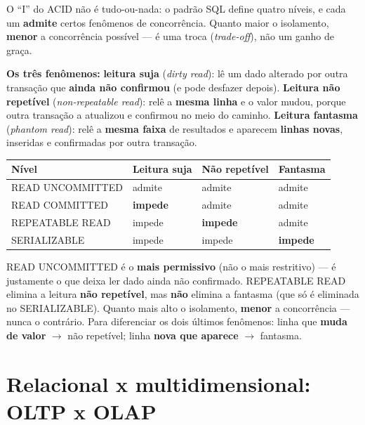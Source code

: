 \begin{conceito}
O “I” do ACID não é tudo-ou-nada: o padrão SQL define quatro níveis, e
cada um \textbf{admite} certos fenômenos de concorrência. Quanto maior o
isolamento, \textbf{menor} a concorrência possível --- é uma troca
(\textit{trade-off}), não um ganho de graça.

\textbf{Os três fenômenos:} \textbf{leitura suja} (\textit{dirty read}):
lê um dado alterado por outra transação que \textbf{ainda não confirmou}
(e pode desfazer depois). \textbf{Leitura não repetível}
(\textit{non-repeatable read}): relê a \textbf{mesma linha} e o valor
mudou, porque outra transação a atualizou e confirmou no meio do caminho.
\textbf{Leitura fantasma} (\textit{phantom read}): relê a \textbf{mesma
faixa} de resultados e aparecem \textbf{linhas novas}, inseridas e
confirmadas por outra transação.

\begin{center}
\begin{tabular}{@{}p{3.6cm}p{2.6cm}p{2.6cm}p{2.6cm}@{}}
\toprule
\textbf{Nível} & \textbf{Leitura suja} & \textbf{Não repetível} &
\textbf{Fantasma} \\
\midrule
READ UNCOMMITTED & admite & admite & admite \\
READ COMMITTED & \textbf{impede} & admite & admite \\
REPEATABLE READ & impede & \textbf{impede} & admite \\
SERIALIZABLE & impede & impede & \textbf{impede} \\
\bottomrule
\end{tabular}
\end{center}
\end{conceito}

\begin{cuidado}
READ UNCOMMITTED é o \textbf{mais permissivo} (não o mais restritivo) ---
é justamente o que deixa ler dado ainda não confirmado. REPEATABLE READ
elimina a leitura \textbf{não repetível}, mas \textbf{não} elimina a
fantasma (que só é eliminada no SERIALIZABLE). Quanto mais alto o
isolamento, \textbf{menor} a concorrência --- nunca o contrário. Para
diferenciar os dois últimos fenômenos: linha que \textbf{muda de valor}
$\to$ não repetível; linha \textbf{nova que aparece} $\to$ fantasma.
\end{cuidado}

\section{Relacional x multidimensional: OLTP x OLAP}

